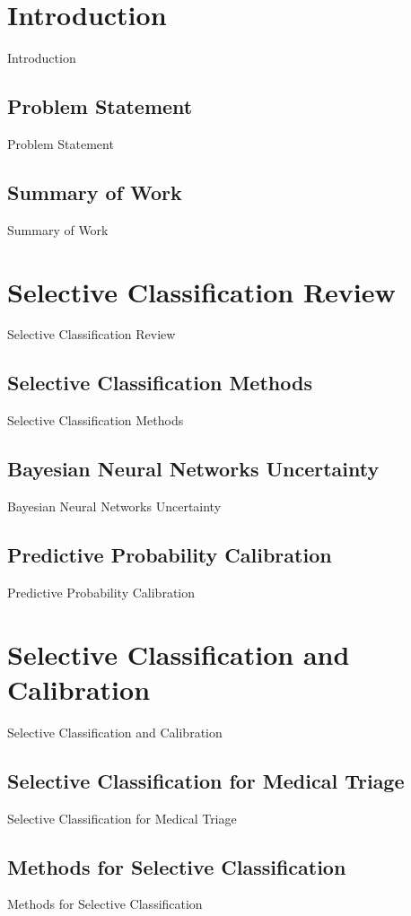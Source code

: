 \section{Introduction}
Introduction

\subsection{Problem Statement}
Problem Statement

\subsection{Summary of Work}
Summary of Work



\section{Selective Classification Review}
Selective Classification Review

\subsection{Selective Classification Methods}
Selective Classification Methods

\subsection{Bayesian Neural Networks Uncertainty}
Bayesian Neural Networks Uncertainty

\subsection{Predictive Probability Calibration}
Predictive Probability Calibration



\section{Selective Classification and Calibration}
Selective Classification and Calibration

\subsection{Selective Classification for Medical Triage}
Selective Classification for Medical Triage

\subsection{Methods for Selective Classification}
Methods for Selective Classification

